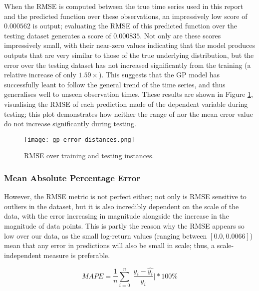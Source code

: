 \documentclass[a4paper, 11pt]{article}
\begin{document}
    When the RMSE is computed between the true time series used in this report and the predicted function over these observations, an impressively low score of $0.000562$ is output; evaluating the RMSE of this predicted function over the testing dataset generates a score of $0.000835$. Not only are these scores impressively small, with their near-zero values indicating that the model produces outputs that are very similar to those of the true underlying distribution, but the error over the testing dataset has not increased significantly from the training (a relative increase of only $1.59 \times$). This suggests that the GP model has successfully leant to follow the general trend of the time series, and thus generalises well to unseen observation times. These results are shown in Figure \ref{fig:rmse}, visualising the RMSE of each prediction made of the dependent variable during testing; this plot demonstrates how neither the range of nor the mean error value do not increase significantly during testing.

    \begin{figure}[ht]
        \centering
        \caption{\centering RMSE over training and testing instances.}
        \texttt{[image: gp-error-distances.png]}
        \label{fig:rmse}
    \end{figure}

    \subsubsection{Mean Absolute Percentage Error}

    However, the RMSE metric is not perfect either; not only is RMSE sensitive to outliers in the dataset, but it is also incredibly dependent on the scale of the data, with the error increasing in magnitude alongside the increase in the magnitude of data points. This is partly the reason why the RMSE appears so low over our data, as the small log-return values (ranging between $[0.0, 0.0066]$) mean that any error in predictions will also be small in scale; thus, a scale-independent measure is preferable. 

    \begin{equation}
        MAPE = \frac{1}{n} \sum_{i=0}^n \bigg\lvert \frac{y_i - \hat{y_i}}{y_i} \bigg\lvert * 100\%
        \label{eq:mape}
    \end{equation}
\end{document}

